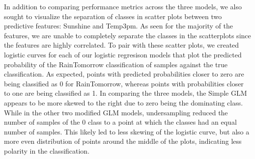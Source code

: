 \documentclass[
]{article}
\begin{document}
In addition to comparing performance metrics across the three models, we
also sought to visualize the separation of classes in scatter plots
between two predictive features: Sunshine and Temp3pm. As seen for the
majority of the features, we are unable to completely separate the
classes in the scatterplots since the features are highly correlated. To
pair with these scatter plots, we created logistic curves for each of
our logistic regresison models that plot the predicted probability of
the RainTomorrow classification of samples against the true
classification. As expected, points with predicted probabilities closer
to zero are being classified as 0 for RainTomorrow, whereas points with
probabilities closer to one are being classified as 1. In comparing the
three models, the Simple GLM appears to be more skewed to the right due
to zero being the dominating class. While in the other two modified GLM
models, undersampling reduced the number of samples of the 0 class to a
point at which the classes had an equal number of samples. This likely
led to less skewing of the logistic curve, but also a more even
distribution of points around the middle of the plots, indicating less
polarity in the classification.
\end{document}

